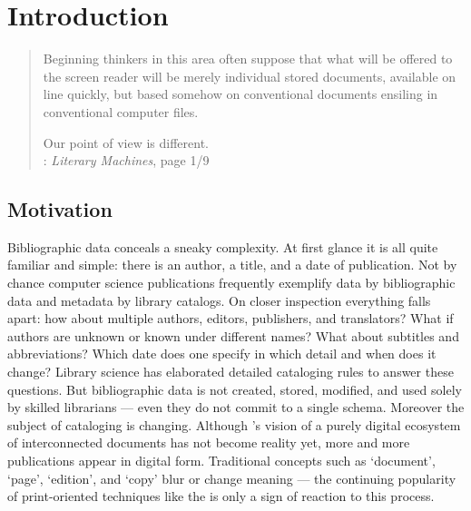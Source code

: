 \chapter{Introduction}
\label{ch:introduction}
\renewcommand{\thepage}{\arabic{page}}%
\setcounter{page}{1}

\begin{quotation}%
Beginning thinkers in this area often suppose that what will
be offered to the screen reader will be merely individual stored documents,
available on line quickly, but based somehow on conventional documents
ensiling in conventional computer files.

\vspace*{1mm}

Our point of view is different.\\
\quotationsource {} \cite*{Nelson1981}:
\textit{Literary Machines}, page 1/9
\end{quotation}

\section{Motivation}

Bibliographic data conceals a sneaky complexity. At first glance it is all
quite familiar and simple: there is an author, a title, and a date of
publication. Not by chance computer science publications frequently exemplify
data by bibliographic data and metadata by library catalogs. On closer
inspection everything falls apart: how about multiple authors, editors,
publishers, and translators? What if authors are unknown or known under
different names? What about subtitles and abbreviations? Which date does one
specify in which detail and when does it change? Library science has elaborated
detailed cataloging rules to answer these questions. But bibliographic data is
not created, stored, modified, and used solely by skilled librarians --- even
they do not commit to a single schema. Moreover the subject of cataloging is
changing.  Although 's vision of a purely digital ecosystem
of interconnected documents has not become reality yet, more and more
publications appear in digital form. Traditional concepts such as `document',
`page', `edition', and `copy' blur or change meaning --- the continuing
popularity of print-oriented techniques like the  is only a sign of reaction to this process.

